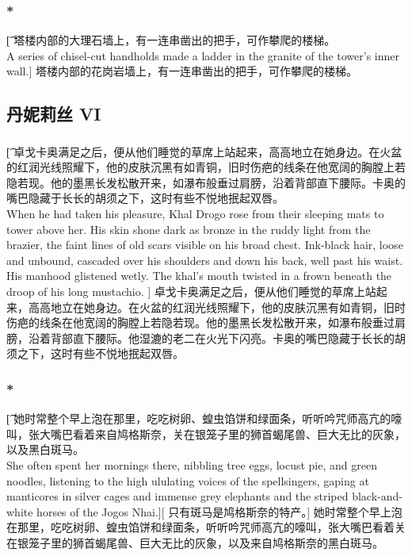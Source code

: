 \documentclass[12pt,a4paper]{article}
\begin{document}
\subsubsection{\color{red}*}\t[	
塔楼内部的大理石墙上，有一连串凿出的把手，可作攀爬的楼梯。\\
A series of chisel-cut handholds made a ladder in the granite of the tower's inner wall.]
塔楼内部的花岗岩墙上，有一连串凿出的把手，可作攀爬的楼梯。

\subsection{丹妮莉丝 VI}
\subsubsection{}\t[
	卓戈卡奥满足之后，便从他们睡觉的草席上站起来，高高地立在她身边。在火盆的红润光线照耀下，他的皮肤沉黑有如青铜，旧时伤疤的线条在他宽阔的胸膛上若隐若现。他的墨黑长发松散开来，如瀑布般垂过肩膀，沿着背部直下腰际。卡奥的嘴巴隐藏于长长的胡须之下，这时有些不悦地抿起双唇。\\
	When he had taken his pleasure, Khal Drogo rose from their sleeping mats to tower above her. His skin shone dark as bronze in the ruddy light from the brazier, the faint lines of old scars visible on his broad chest. Ink-black hair, loose and unbound, cascaded over his shoulders and down his back, well past his waist. His manhood glistened wetly. The khal's mouth twisted in a frown beneath the droop of his long mustachio. ]
	卓戈卡奥满足之后，便从他们睡觉的草席上站起来，高高地立在她身边。在火盆的红润光线照耀下，他的皮肤沉黑有如青铜，旧时伤疤的线条在他宽阔的胸膛上若隐若现。他的墨黑长发松散开来，如瀑布般垂过肩膀，沿着背部直下腰际。他湿漉的老二在火光下闪亮。卡奥的嘴巴隐藏于长长的胡须之下，这时有些不悦地抿起双唇。

\subsubsection{\color{red}*}\t[	
	她时常整个早上泡在那里，吃吃树卵、蝗虫馅饼和绿面条，听听吟咒师高亢的嚎叫，张大嘴巴看着来自鸠格斯奈，关在银笼子里的狮首蝎尾兽、巨大无比的灰象，以及黑白斑马。\\
	She often spent her mornings there, nibbling tree eggs, locust pie, and green noodles, listening to the high ululating voices of the spellsingers, gaping at manticores in silver cages and immense grey elephants and the striped black-and-white horses of the Jogos Nhai.][
	只有斑马是鸠格斯奈的特产。]
	她时常整个早上泡在那里，吃吃树卵、蝗虫馅饼和绿面条，听听吟咒师高亢的嚎叫，张大嘴巴看着关在银笼子里的狮首蝎尾兽、巨大无比的灰象，以及来自鸠格斯奈的黑白斑马。
	
\end{document}
